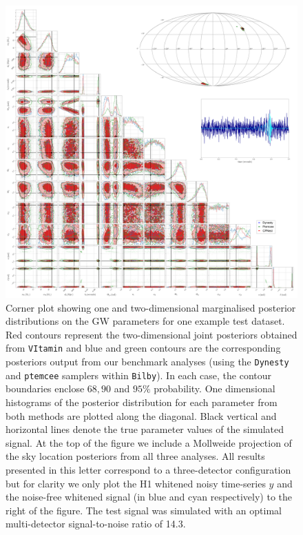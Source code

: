 \documentclass[%
showpacs,
nofootinbib,
 amsmath,amssymb,
 aps,
 twocolumn,
 prl,
 reprint,
floatfix,
]{revtex4-1}
\begin{document}
%
%
\begin{figure}
    \includegraphics[width=\textwidth]{corner_testcase0.png}
    \caption{\label{fig:corner_plot} Corner plot showing one and two-dimensional
marginalised posterior distributions on the \ac{GW} parameters for one
example test dataset. Red contours represent the
two-dimensional joint posteriors obtained from \texttt{VItamin} and
blue and green contours are the corresponding posteriors
output from our benchmark analyses (using the \texttt{Dynesty} and \texttt{ptemcee}
samplers within \texttt{Bilby}). In each case, the contour boundaries enclose
$68,90$ and $95\%$ probability. One dimensional histograms of the posterior
distribution for each parameter from both methods are plotted along the
diagonal. Black vertical and horizontal lines denote the true parameter
values of the simulated signal. At the top of the figure we include a Mollweide
projection of the sky location posteriors from all three analyses. All results
presented in this letter correspond to a three-detector configuration but for
clarity we only plot the H1 whitened noisy time-series $y$ and the noise-free
whitened signal (in blue and cyan respectively) to the right of the figure. The
test signal was simulated with an optimal multi-detector signal-to-noise ratio of
14.3.} 
\end{figure}
\end{document}
